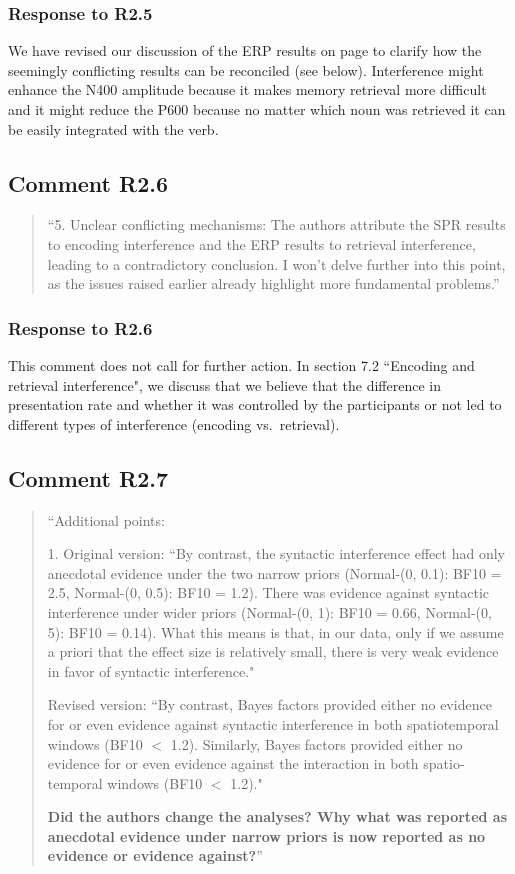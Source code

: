 \documentclass[12pt]{article}
\begin{document}
\subsubsection*{Response to R2.5}
 
We have revised our discussion of the ERP results on page \pageref{inhibition_facilitation} to clarify how the seemingly conflicting results can be reconciled (see below). Interference might enhance the N400 amplitude because it makes memory retrieval more difficult and it might reduce the P600 because no matter which noun was retrieved it can be easily integrated with the verb.

\begin{quote}
\end{quote}
 
\subsection*{Comment R2.6}
\begin{quote}
``5. Unclear conflicting mechanisms: The authors attribute the SPR results to encoding interference and the ERP results to retrieval interference, leading to a contradictory conclusion. I won't delve further into this point, as the issues raised earlier already highlight more fundamental problems.''
\end{quote}
\subsubsection*{Response to R2.6}
This comment does not call for further action. In section 7.2 ``Encoding and retrieval interference", we discuss that we believe that the difference in presentation rate and whether it was controlled by the participants or not led to different types of interference (encoding vs.\ retrieval).
 
\subsection*{Comment R2.7}
\begin{quote}
``Additional points:

1. Original version: ``By contrast, the syntactic interference effect had only anecdotal evidence under the two narrow priors (Normal-(0, 0.1): BF10 = 2.5, Normal-(0, 0.5): BF10 = 1.2). There was evidence against syntactic interference under wider priors (Normal-(0, 1): BF10 = 0.66, Normal-(0, 5): BF10 = 0.14). What this means is that, in our data, only if we assume a priori that the effect size is relatively small, there is very weak evidence in favor of syntactic interference."

Revised version: ``By contrast, Bayes factors provided either no evidence for or even evidence against syntactic interference in both spatiotemporal windows (BF10 $<$ 1.2). Similarly, Bayes factors provided either no evidence for or even evidence against the interaction in both spatio-temporal windows (BF10 $<$ 1.2)."

\textbf{Did the authors change the analyses? Why what was reported as anecdotal evidence under narrow priors is now reported as no evidence or evidence against?}''
\end{quote}
\end{document}
